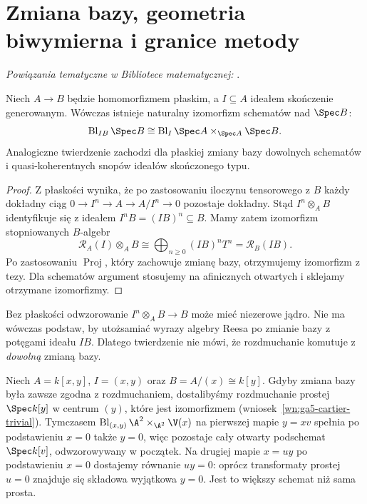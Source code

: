 \section{Zmiana bazy, geometria biwymierna i granice metody}
\label{sec:ga5-basechange}

\noindent\emph{Powiązania tematyczne w Bibliotece matematycznej:} .


\begin{twierdzenie}
\label{tw:ga5-flat-basechange}
Niech $A\to B$ będzie homomorfizmem płaskim,
a $I\subseteq A$ ideałem skończenie generowanym.
Wówczas istnieje naturalny izomorfizm schematów nad
$\Spec B$:
\[
 \operatorname{Bl}_{IB}\Spec B\cong
 \operatorname{Bl}_{I}\Spec A\times_{\Spec A}\Spec B.
\]
Analogiczne twierdzenie zachodzi dla płaskiej zmiany
bazy dowolnych schematów i quasi-koherentnych
snopów ideałów skończonego typu.
\end{twierdzenie}
\begin{proof}
Z płaskości wynika, że po zastosowaniu iloczynu tensorowego z $B$
każdy dokładny ciąg
$0\to I^n\to A\to A/I^n\to0$ pozostaje dokładny.
Stąd $I^n\otimes_A B$ identyfikuje się z ideałem
$I^nB=(IB)^n\subseteq B$. Mamy zatem izomorfizm
stopniowanych $B$-algebr
\[
 \mathcal R_A(I)\otimes_A B\cong
 \bigoplus_{n\ge0}(IB)^nT^n=\mathcal R_B(IB).
\]
Po zastosowaniu $\operatorname{Proj}$, który zachowuje
zmianę bazy, otrzymujemy izomorfizm z tezy.
Dla schematów argument stosujemy na afinicznych
otwartych i sklejamy otrzymane izomorfizmy.
\end{proof}

\begin{uwaga}
Bez płaskości odwzorowanie $I^n\otimes_A B\to B$
może mieć niezerowe jądro. Nie ma wówczas podstaw,
by utożsamiać wyrazy algebry Reesa po zmianie bazy
z potęgami ideału $IB$. Dlatego twierdzenie nie mówi,
że rozdmuchanie komutuje z \emph{dowolną} zmianą bazy.
\end{uwaga}

\begin{przyklad}
Niech $A=k[x,y]$, $I=(x,y)$ oraz
$B=A/(x)\cong k[y]$. Gdyby zmiana bazy była zawsze
zgodna z rozdmuchaniem, dostalibyśmy rozdmuchanie
prostej $\Spec k[y]$ w centrum $(y)$, które jest
izomorfizmem (wniosek~\ref{wn:ga5-cartier-trivial}).
Tymczasem
$\operatorname{Bl}_{(x,y)}\A^2\times_{\A^2}\V(x)$
na pierwszej mapie $y=xv$ spełnia po podstawieniu
$x=0$ także $y=0$, więc pozostaje cały
otwarty podschemat $\Spec k[v]$, odwzorowywany w początek.
Na drugiej mapie $x=uy$ po podstawieniu $x=0$
dostajemy równanie $uy=0$: oprócz transformaty
prostej $u=0$ znajduje się składowa wyjątkowa
$y=0$. Jest to większy schemat niż sama prosta.
\end{przyklad}

